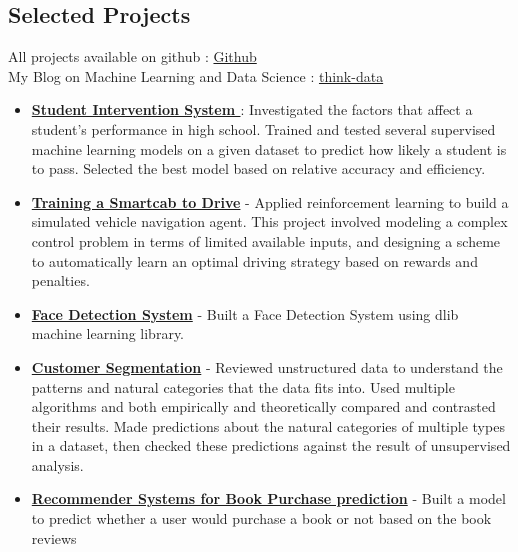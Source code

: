 \documentclass[margin, centered]{res}
\begin{document}
\begin{resume}
\section{Selected Projects}
All projects available on github : \href{https://www.github.com/think-data}{Github} \\
My Blog on Machine Learning and Data Science : \href{https://www.think-data.github.io}{think-data}
\begin{itemize}[leftmargin=*]
 \item \textbf{\href{https://github.com/think-data/ml-nanodegree/tree/master/student_intervention}{Student Intervention System }} : Investigated the factors that affect a student's performance in high school. Trained and tested several supervised machine learning models on a given dataset to predict how likely a student is to pass. Selected the best model based on relative accuracy and efficiency.
 \item \textbf{\href{https://github.com/think-data/ml-nanodegree/tree/master/smartcab}{Training a Smartcab to Drive}} - Applied reinforcement learning to build a simulated vehicle navigation agent. This project involved modeling a complex control problem in terms of limited available inputs, and designing a scheme to automatically learn an optimal driving strategy based on rewards and penalties.
 \item \textbf{\href{https://github.com/think-data/face-detection}{Face Detection System}} - Built a Face Detection System using dlib machine learning library.
 \item \textbf{\href{https://github.com/think-data/ml-nanodegree/tree/master/creating_customer_segments}{Customer Segmentation}} - Reviewed unstructured data to understand the patterns and natural categories that the data fits into. Used multiple algorithms and both empirically and theoretically compared and contrasted their results. Made predictions about the natural categories of multiple types in a dataset, then checked these predictions against the result of unsupervised analysis.
 \item \textbf{\href{https://raw.githubusercontent.com/think-data/ml-nanodegree/master/capstone/report_new.pdf}{Recommender Systems for Book Purchase prediction}} - Built a model to predict whether a user would purchase a book or not based on the book reviews
\end{itemize}



\end{resume}
\end{document}
